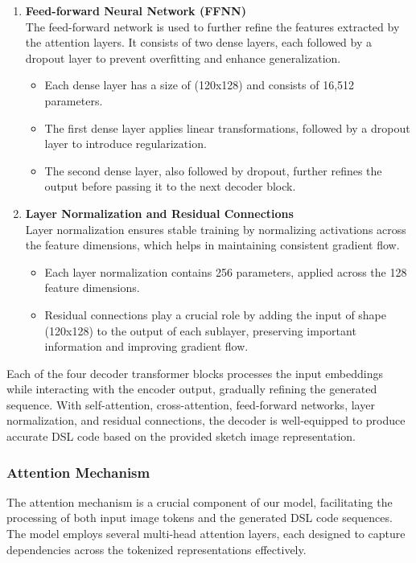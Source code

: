 \begin{enumerate}[label=\textbf{\roman*}]
    \item \textbf{Feed-forward Neural Network (FFNN)} \\
    The feed-forward network is used to further refine the features extracted by the attention layers. It consists of two dense layers, each followed by a dropout layer to prevent overfitting and enhance generalization.
    
    \begin{itemize}
        \item Each dense layer has a size of (120x128) and consists of 16,512 parameters.
        \item The first dense layer applies linear transformations, followed by a dropout layer to introduce regularization.
        \item The second dense layer, also followed by dropout, further refines the output before passing it to the next decoder block.
    \end{itemize}
    
    \item \textbf{Layer Normalization and Residual Connections} \\
    Layer normalization ensures stable training by normalizing activations across the feature dimensions, which helps in maintaining consistent gradient flow.
    
    \begin{itemize}
        \item Each layer normalization contains 256 parameters, applied across the 128 feature dimensions.
        \item Residual connections play a crucial role by adding the input of shape (120x128) to the output of each sublayer, preserving important information and improving gradient flow.
    \end{itemize}
\end{enumerate}
Each of the four decoder transformer blocks processes the input embeddings while interacting with the encoder output, gradually refining the generated sequence. With self-attention, cross-attention, feed-forward networks, layer normalization, and residual connections, the decoder is well-equipped to produce accurate DSL code based on the provided sketch image representation.

\subsubsection{Attention Mechanism}
The attention mechanism is a crucial component of our model, facilitating the processing of both input image tokens and the generated DSL code sequences. The model employs several multi-head attention layers, each designed to capture dependencies across the tokenized representations effectively.

